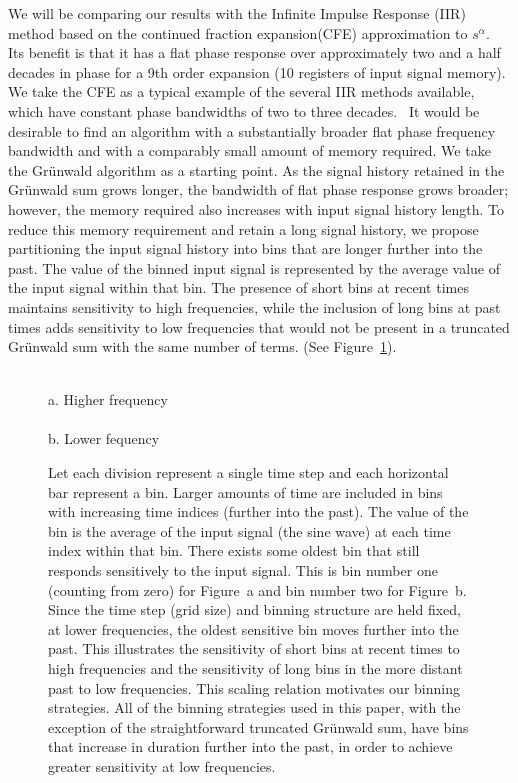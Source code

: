 We will be comparing our results with the Infinite Impulse Response (IIR) method 
based on the continued fraction expansion(CFE)  approximation to
$s^\alpha$.~\cite{Chen:04a} Its benefit is that it has a flat phase response over
approximately two and a half decades in phase for a 9th order
expansion (10 registers of input signal memory). We take the CFE as a typical example of the several IIR methods available, which have constant phase bandwidths of two to three decades.~\cite{Romero:13} It would be desirable
to find an algorithm with a substantially broader flat phase frequency
bandwidth and with a comparably small amount of memory required. We
take the Gr{\"u}nwald algorithm as a starting point. As the signal history
retained in the Gr{\"u}nwald sum grows longer, the bandwidth of flat phase
response grows broader; however, the memory required also increases
with input signal history length. To reduce this memory requirement
and retain a long signal history, we propose partitioning the input
signal history into bins that are longer further into the past. The
value of the binned input signal is represented by the average value
of the input signal within that bin. The presence of short bins at
recent times maintains sensitivity to high frequencies, while the 
inclusion of long bins at past times adds sensitivity to low frequencies 
that would not be present in a truncated Gr{\"u}nwald 
sum with the same number of terms. (See Figure~\ref{fig:freqScaling}).


\begin{figure}
\centering
{}
\\a. Higher frequency\\
\\b. Lower fequency
\caption{Let each division represent a single time step and each horizontal  bar represent a bin. Larger amounts of time are included in bins with increasing time indices (further into the past). The value of the bin is the average of the input signal (the sine wave) at each time index within that bin. There exists some oldest bin that still responds sensitively to the input signal. This is bin number one (counting from zero) for Figure~a and bin number two for Figure~b. Since the time step (grid size) and binning structure are held fixed, at lower frequencies, the oldest sensitive bin moves further into the past. This illustrates the sensitivity of short bins at recent times to high frequencies and the sensitivity of long bins in the more distant past to low frequencies. This scaling relation motivates our binning strategies. All of the binning strategies used in this paper, with the exception of the straightforward truncated Gr{\"u}nwald sum, have bins that increase in duration further into the past, in order to achieve greater sensitivity at low frequencies.}
\label{fig:freqScaling}
\end{figure}

